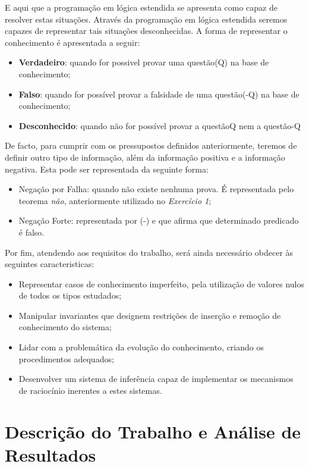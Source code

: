 E aqui que a programação em lógica estendida se apresenta como capaz de resolver estas situações. Através da programação em lógica estendida seremos capazes de representar tais situações desconhecidas. A forma de representar o conhecimento é apresentada a seguir:


\begin{itemize}
	\item \textbf{Verdadeiro}: quando for possivel provar uma questão(Q) na base de conhecimento; 
	\item \textbf{Falso}: quando for possível provar a falsidade de uma questão(-Q) na base de conhecimento;
	\item \textbf{Desconhecido}: quando não for possível provar a questãoQ nem a questão-Q
\end{itemize}


De facto, para cumprir com os pressupostos definidos anteriormente, teremos de definir outro tipo de informação, além da informação positiva e a informação negativa. Esta pode ser
representada da seguinte forma:


\begin{itemize}
	\item Negação por Falha: quando não existe nenhuma prova. É representada pelo teorema \textit{não}, anteriormente utilizado no \textit{Exercício 1};
	\item Negação Forte:  representada por (-) e que afirma que determinado predicado é falso.
\end{itemize}

Por fim, atendendo aos requisitos do trabalho, será ainda necessário obdecer às seguintes
caracteristicas:

\begin{itemize}
	\item Representar casos de conhecimento imperfeito, pela utilização de valores nulos de todos os tipos estudados;
	\item Manipular invariantes que designem restrições de inserção e remoção de conhecimento do sistema; 
	\item Lidar com a problemática da evolução do conhecimento, criando os procedimentos adequados;
	\item Desenvolver um sistema de inferência capaz de implementar os mecanismos de raciocínio inerentes a estes sistemas.

\end{itemize}

\chapter{Descrição do Trabalho e Análise de Resultados}
\label{cap:p3}


